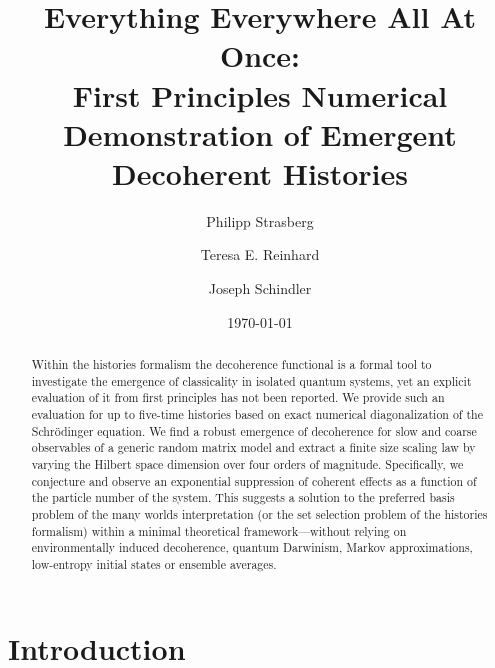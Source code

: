 \documentclass[pre,twocolumn,10pt,aps,longbibliography,nofootinbib]{revtex4-1}
\newcommand{\blue}[1]{#1}
\begin{document}
\title{Everything Everywhere All At Once: \\\blue{First Principles Numerical Demonstration of Emergent Decoherent Histories}}

\author{Philipp Strasberg}
\author{Teresa E. Reinhard}
\author{Joseph Schindler}


\date{\today}

\begin{abstract}
 Within the histories formalism the decoherence functional is a formal tool to investigate the emergence of classicality in isolated quantum systems, yet an explicit evaluation of it from first principles has not been reported. We provide such an evaluation for up to five-time histories based on exact numerical diagonalization of the Schr\"odinger equation. We find a robust emergence of decoherence for slow and coarse observables of a generic random matrix model and extract a finite size scaling law by varying the Hilbert space dimension over four orders of magnitude. Specifically, we conjecture and observe an exponential suppression of coherent effects as a function of the particle number of the system. This suggests a solution to the preferred basis problem of the many worlds interpretation (or the set selection problem of the histories formalism) within a minimal theoretical framework---without relying on environmentally induced decoherence, quantum Darwinism, Markov approximations, low-entropy initial states or ensemble averages.
\end{abstract}

\maketitle

\newtheorem{lemma}{Lemma}[section]

\section{Introduction}
\label{sec intro}
\end{document}
